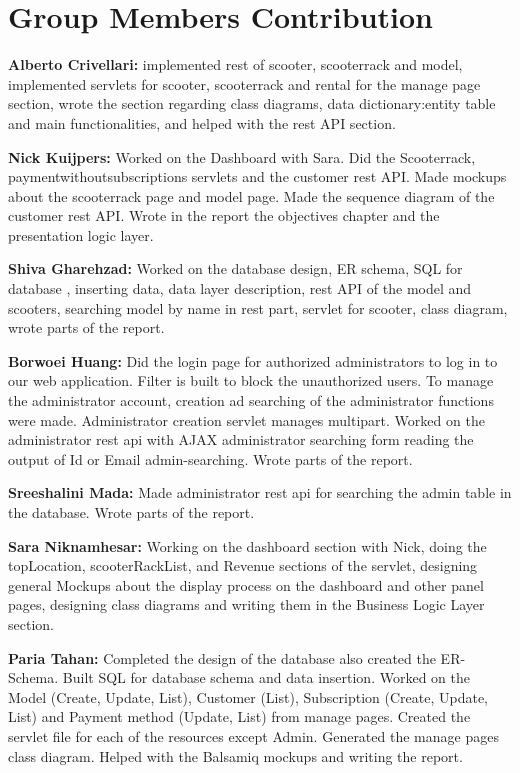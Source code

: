 \section{Group Members Contribution}


\begin{description}
\item \textbf{Alberto Crivellari:} implemented rest of scooter, scooterrack and model, implemented servlets for scooter, scooterrack and rental for the manage page section, wrote the section regarding class diagrams, data dictionary:entity table and main functionalities, and helped with the rest API section.

\item \textbf{Nick Kuijpers:}
Worked on the Dashboard with Sara. Did the Scooterrack, paymentwithoutsubscriptions servlets and the customer rest API. Made mockups about the scooterrack page and model page. Made the sequence diagram of the customer rest API. Wrote in the report the objectives chapter and the presentation logic layer.

\item \textbf{Shiva Gharehzad:}
Worked on the database design, ER schema, SQL for database , inserting data, data layer description, rest API of the model and scooters, searching model by name in rest part,  servlet for scooter, class diagram, wrote parts of the report. 

\item \textbf{Borwoei Huang:}
Did the login page for authorized administrators to log in to our web application. Filter is built to block the unauthorized users. To manage the administrator account, creation ad searching of the administrator functions were made. Administrator creation servlet manages multipart. Worked on the administrator rest api with AJAX administrator searching form reading the output of Id or Email admin-searching. Wrote parts of the report.


\item \textbf{Sreeshalini Mada:}
Made administrator rest api for searching the admin table in the database. Wrote parts of the report.

\item \textbf{Sara Niknamhesar:}
Working on the dashboard section with Nick, doing the topLocation, scooterRackList, and Revenue sections of the servlet, designing general Mockups about the display process on the dashboard and other panel pages, designing class diagrams and writing them in the Business Logic Layer section.

\item \textbf{Paria Tahan:}
Completed the design of the database also created the ER-Schema. Built SQL for database schema and data insertion. Worked on the Model (Create, Update, List), Customer (List), Subscription (Create, Update, List) and Payment method (Update, List) from manage pages. Created the servlet file for each of the resources except Admin. Generated the manage pages class diagram. Helped with the Balsamiq mockups and writing the report.



\end{description}
